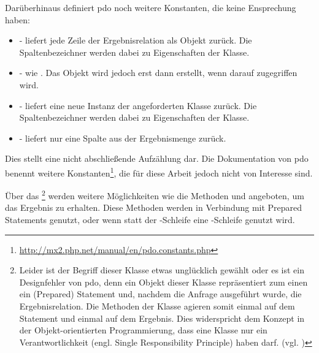 Darüberhinaus definiert \gls{pdo} noch weitere Konstanten, die keine Ensprechung haben:

\begin{itemize}
	\item {} - liefert jede Zeile der Ergebnisrelation als Objekt zurück. Die Spaltenbezeichner werden dabei zu Eigenschaften der Klasse.
	\item {} - wie . Das Objekt wird jedoch erst dann erstellt, wenn darauf zugegriffen wird.
	\item {} - liefert eine neue Instanz der angeforderten Klasse zurück. Die Spaltenbezeichner werden dabei zu Eigenschaften der Klasse.
	\item {} - liefert nur eine Spalte aus der Ergebnismenge zurück.
\end{itemize}

Dies stellt eine nicht abschließende Aufzählung dar. Die Dokumentation von \gls{pdo} benennt weitere Konstanten\footnote{\url{http://mx2.php.net/manual/en/pdo.constants.php}}, die für diese Arbeit jedoch nicht von Interesse sind.

Über das \footnote{Leider ist der Begriff dieser Klasse etwas unglücklich gewählt oder es ist ein Designfehler von \gls{pdo}, denn ein Objekt dieser Klasse repräsentiert zum einen ein (Prepared) Statement und, nachdem die Anfrage ausgeführt wurde, die Ergebnisrelation. Die Methoden der Klasse agieren somit einmal auf dem Statement und einmal auf dem Ergebnis. Dies widerspricht dem Konzept in der Objekt-orientierten Programmierung, dass eine Klasse nur ein Verantwortlichkeit (engl. Single Responsibility Principle) haben darf. (vgl. \cite[S. 181]{book:martinCleanCode2008})} werden weitere Möglichkeiten wie die Methoden  und  angeboten, um das Ergebnis zu erhalten. Diese Methoden werden in Verbindung mit Prepared Statements genutzt, oder wenn statt der -Schleife eine -Schleife genutzt wird.

\begin{listing}[H]
\label{lst:fetctWithWhileLoop}
\end{listing}

